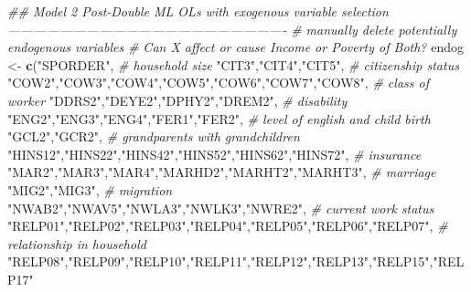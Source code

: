 \documentclass[
]{article}
\newenvironment{Shaded}{\begin{snugshade}}{\end{snugshade}}
\newcommand{\CommentTok}[1]{\textcolor[rgb]{0.56,0.35,0.01}{\textit{#1}}}
\newcommand{\KeywordTok}[1]{\textcolor[rgb]{0.13,0.29,0.53}{\textbf{#1}}}
\newcommand{\NormalTok}[1]{#1}
\newcommand{\StringTok}[1]{\textcolor[rgb]{0.31,0.60,0.02}{#1}}
\begin{document}
\begin{Shaded}
\begin{Highlighting}[]
\CommentTok{## Model 2 Post-Double ML OLs with exogenous variable selection ----------------------------------------------------------------}
\CommentTok{# manually delete potentially endogenous variables}
\CommentTok{# Can X affect or cause Income or Poverty of Both?}
\NormalTok{endog <-}\StringTok{ }\KeywordTok{c}\NormalTok{(}\StringTok{"SPORDER"}\NormalTok{,    }\CommentTok{# household size}
           \StringTok{"CIT3"}\NormalTok{,}\StringTok{"CIT4"}\NormalTok{,}\StringTok{"CIT5"}\NormalTok{,     }\CommentTok{# citizenship status}
           \StringTok{"COW2"}\NormalTok{,}\StringTok{"COW3"}\NormalTok{,}\StringTok{"COW4"}\NormalTok{,}\StringTok{"COW5"}\NormalTok{,}\StringTok{"COW6"}\NormalTok{,}\StringTok{"COW7"}\NormalTok{,}\StringTok{"COW8"}\NormalTok{,   }\CommentTok{# class of worker}
           \StringTok{"DDRS2"}\NormalTok{,}\StringTok{"DEYE2"}\NormalTok{,}\StringTok{"DPHY2"}\NormalTok{,}\StringTok{"DREM2"}\NormalTok{,     }\CommentTok{# disability}
           \StringTok{"ENG2"}\NormalTok{,}\StringTok{"ENG3"}\NormalTok{,}\StringTok{"ENG4"}\NormalTok{,}\StringTok{"FER1"}\NormalTok{,}\StringTok{"FER2"}\NormalTok{,     }\CommentTok{# level of english and child birth}
           \StringTok{"GCL2"}\NormalTok{,}\StringTok{"GCR2"}\NormalTok{,     }\CommentTok{# grandparents with grandchildren}
           \StringTok{"HINS12"}\NormalTok{,}\StringTok{"HINS22"}\NormalTok{,}\StringTok{"HINS42"}\NormalTok{,}\StringTok{"HINS52"}\NormalTok{,}\StringTok{"HINS62"}\NormalTok{,}\StringTok{"HINS72"}\NormalTok{,    }\CommentTok{# insurance}
           \StringTok{"MAR2"}\NormalTok{,}\StringTok{"MAR3"}\NormalTok{,}\StringTok{"MAR4"}\NormalTok{,}\StringTok{"MARHD2"}\NormalTok{,}\StringTok{"MARHT2"}\NormalTok{,}\StringTok{"MARHT3"}\NormalTok{,   }\CommentTok{# marriage}
           \StringTok{"MIG2"}\NormalTok{,}\StringTok{"MIG3"}\NormalTok{,    }\CommentTok{# migration}
           \StringTok{"NWAB2"}\NormalTok{,}\StringTok{"NWAV5"}\NormalTok{,}\StringTok{"NWLA3"}\NormalTok{,}\StringTok{"NWLK3"}\NormalTok{,}\StringTok{"NWRE2"}\NormalTok{,   }\CommentTok{# current work status}
           \StringTok{"RELP01"}\NormalTok{,}\StringTok{"RELP02"}\NormalTok{,}\StringTok{"RELP03"}\NormalTok{,}\StringTok{"RELP04"}\NormalTok{,}\StringTok{"RELP05"}\NormalTok{,}\StringTok{"RELP06"}\NormalTok{,}\StringTok{"RELP07"}\NormalTok{,    }\CommentTok{# relationship in household}
           \StringTok{"RELP08"}\NormalTok{,}\StringTok{"RELP09"}\NormalTok{,}\StringTok{"RELP10"}\NormalTok{,}\StringTok{"RELP11"}\NormalTok{,}\StringTok{"RELP12"}\NormalTok{,}\StringTok{"RELP13"}\NormalTok{,}\StringTok{"RELP15"}\NormalTok{,}\StringTok{"RELP17"}

\end{Highlighting}
\end{Shaded}
\end{document}
